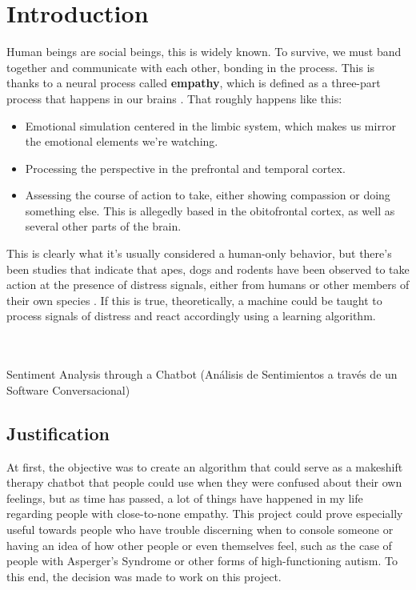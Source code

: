\chapter{Introduction}
Human beings are social beings, this is widely known. To survive, we must band together and communicate with each other, bonding in the process. This is thanks to a neural process called \textbf{empathy}, which is defined as a three-part process that happens in our brains \citep{rf1}. That roughly happens like this:
\begin{itemize}
	\item Emotional simulation centered in the limbic system, which makes us mirror the emotional elements we're watching.
	\item Processing the perspective in the prefrontal and temporal cortex.
	\item Assessing the course of action to take, either showing compassion or doing something else. This is allegedly based in the obitofrontal cortex, as well as several other parts of the brain.
\end{itemize}
This is clearly what it's usually considered a human-only behavior, but there's been studies that indicate that apes, dogs and rodents have been observed to take action at the presence of distress signals, either from humans or other members of their own species \citep{rf2}.
If this is true, theoretically, a machine could be taught to process signals of distress and react accordingly using a learning algorithm. \\ \\ \\

\begin{center}
	\huge{Sentiment Analysis through a Chatbot (Análisis de Sentimientos a través de un Software Conversacional)}
\end{center}

\section{Justification}
At first, the objective was to create an algorithm that could serve as a makeshift therapy chatbot that people could use when they were confused about their own feelings, but as time has passed, a lot of things have happened in my life regarding people with close-to-none empathy.
This project could prove especially useful towards people who have trouble discerning when to console someone or having an idea of how other people or even themselves feel, such as the case of people with Asperger's Syndrome or other forms of high-functioning autism.
To this end, the decision was made to work on this project.

